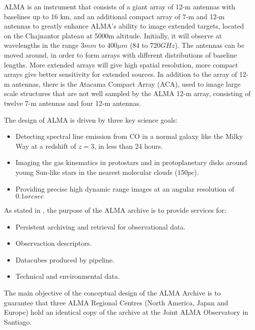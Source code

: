 ALMA is an instrument that consists of a giant array of 12-m antennas with baselines up to 16 km, and an additional compact array of 7-m and 12-m antennas to greatly enhance ALMA's ability to image extended targets, located on the Chajnantor plateau at 5000m altitude. Initially, it will observe at wavelengths in the range $3 mm$ to $400 μm$ ($84$ to $720 GHz$). The antennas can be moved around, in order to form arrays with different distributions of baseline lengths. More extended arrays will give high spatial resolution, more compact arrays give better sensitivity for extended sources. In addition to the array of 12-m antennas, there is the Atacama Compact Array (ACA), used to image large scale structures that are not well sampled by the ALMA 12-m array, consisting of twelve 7-m antennas and four 12-m antennas. \newline

The design of ALMA is driven by three key science goals:

\begin{itemize}

\item Detecting spectral line emission from CO in a normal galaxy like the Milky Way at a redshift of $z=3$, in less than 24 hours.

\item Imaging the gas kinematics in protostars and in protoplanetary disks around young Sun-like stars in the nearest molecular clouds ($150 pc$).

\item Providing precise high dynamic range images at an angular resolution of $0.1 arcsec$
\end{itemize}
 
As stated in \cite{Etoka12}, the purpose of the ALMA archive is to provide services for:

\begin{itemize}
\item Persistent archiving and retrieval for observational data.
\item Observaction descriptors.
\item Datacubes produced by pipeline.
\item Technical and environmental data.
\end{itemize}

The main objective of the conceptual design of the ALMA Archive is to guarantee that three ALMA Regional Centres (North America, Japan and Europe) hold an identical copy of the archive at the Joint ALMA Observatory in Santiago. \newline

